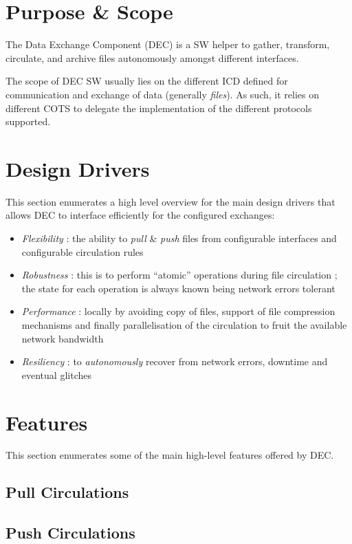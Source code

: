 \documentclass[dec_sum_main.tex]{subfiles}
\begin{document}
\section{Purpose \& Scope}
The Data Exchange Component (DEC) is a SW helper to gather, transform, circulate, and archive files autonomously amongst different interfaces. \newline
\par
\noindent
The scope of DEC SW usually lies on the different ICD defined for communication and exchange of data (generally \textit{files}). As such, it relies on different COTS to delegate the implementation of the different protocols supported.

\section{Design Drivers}
This section enumerates a high level overview for the main design drivers that allows DEC to interface efficiently for the configured exchanges:

\begin{itemize}
	\item \textit{Flexibility} : the ability to \textit{pull} \& \textit{push} files from configurable interfaces and configurable circulation rules
	\item \textit{Robustness} : this is to perform “atomic” operations during file circulation ; the state for each operation is always known being network errors tolerant
	\item \textit{Performance} : locally by avoiding copy of files, support of file compression mechanisms and finally parallelisation of the circulation to fruit the available network bandwidth
	\item \textit{Resiliency} : to \textit{autonomously} recover from network errors, downtime and eventual glitches
\end{itemize}

\section{Features}
This section enumerates some of the main high-level features offered by DEC.

\subsection{Pull Circulations}

\subsection{Push Circulations}
\end{document}

